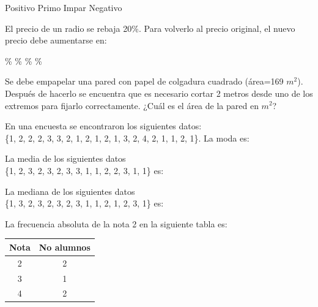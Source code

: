 \documentclass[10pt,letterpaper,addpoints]{exam}
\begin{document}
\begin{multicols}{2}
\begin{questions}
\begin{choices}
\CorrectChoice Positivo
\choice Primo
\choice Impar
\choice Negativo
\end{choices}
\question El precio de un radio se rebaja 20\%. Para volverlo al precio original, el nuevo precio debe aumentarse en:

\begin{oneparchoices}
\%
\%
\%
\%
\end{oneparchoices}
\question Se debe empapelar una pared con papel de colgadura cuadrado (área=169 $m^{2}$). Después de hacerlo se encuentra que es necesario cortar 2 metros desde uno de los extremos para fijarlo correctamente. ¿Cuál es el área de la pared en $m^{2}$?

\begin{oneparchoices}
\end{oneparchoices}
\question En una encuesta se encontraron los siguientes datos:\\ \{1, 2, 2, 2, 3, 3, 2, 1, 2, 1, 2, 1, 3, 2, 4, 2, 1, 1, 2, 1\}. La moda es:

\begin{oneparchoices}
\end{oneparchoices}
\question La media de los siguientes datos\\ \{1, 2, 3, 2, 3, 2, 3, 3, 1, 1, 2, 2, 3, 1, 1\} es:

\begin{oneparchoices}
\end{oneparchoices}
\question La mediana de los siguientes datos\\ \{1, 3, 2, 3, 2, 3, 2, 3, 1, 1, 2, 1, 2, 3, 1\} es:

\begin{oneparchoices}
\end{oneparchoices}
\question La frecuencia absoluta de la nota 2 en la siguiente tabla es:

\begin{center}
\begin{tabular}{|c|c|}
\hline 
Nota & No alumnos \\ 
\hline 
2 & 2 \\ 
\hline 
3 & 1 \\ 
\hline 
4 & 2 \\ 
\hline 
\end{tabular} 
\end{center}


\end{questions}
\end{multicols}
\end{document}
